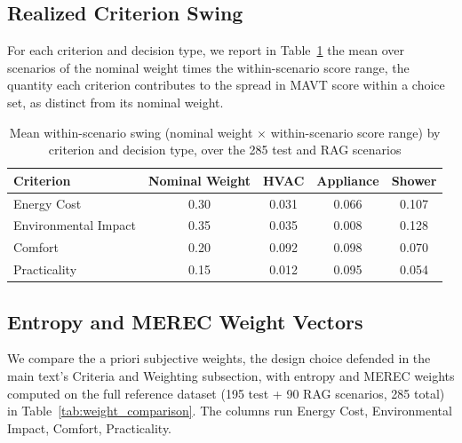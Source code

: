 \documentclass[11pt]{article}
\begin{document}
\subsection{Realized Criterion Swing}
\label{app:swing_weights}

For each criterion and decision type, we report in Table~\ref{tab:swing_weights} the mean over scenarios of the nominal weight times the within-scenario score range, the quantity each criterion contributes to the spread in MAVT score within a choice set, as distinct from its nominal weight.

\begin{table}[htbp]
\centering
\footnotesize
\centering
\caption{Mean within-scenario swing (nominal weight $\times$ within-scenario score range) by criterion and decision type, over the 285 test and RAG scenarios}
\label{tab:swing_weights}
\renewcommand{\arraystretch}{1.15}
\begin{tabular}{lcccc}
\toprule
Criterion & Nominal Weight & HVAC & Appliance & Shower \\
\midrule
Energy Cost & 0.30 & 0.031 & 0.066 & 0.107 \\
Environmental Impact & 0.35 & 0.035 & 0.008 & 0.128 \\
Comfort & 0.20 & 0.092 & 0.098 & 0.070 \\
Practicality & 0.15 & 0.012 & 0.095 & 0.054 \\
\bottomrule
\end{tabular}
\renewcommand{\arraystretch}{1.0}
\end{table}

\subsection{Entropy and MEREC Weight Vectors}
\label{app:weights}

We compare the a priori subjective weights, the design choice defended in the main text's Criteria and Weighting subsection, with entropy and MEREC weights computed on the full reference dataset (195 test + 90 RAG scenarios, 285 total) in Table~\ref{tab:weight_comparison}. The columns run Energy Cost, Environmental Impact, Comfort, Practicality.
\end{document}
